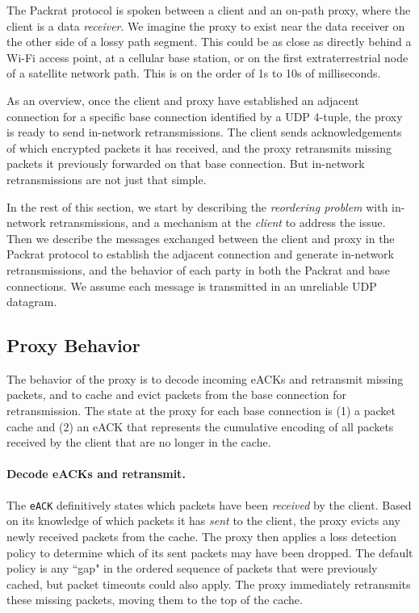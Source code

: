 The Packrat protocol is spoken between a client and an on-path proxy, where the
client is a data \textit{receiver}. We imagine the proxy to exist near the data
receiver on the other side of a lossy path segment. This could be as close as
directly behind a Wi-Fi access point, at a cellular base station, or on the
first extraterrestrial node of a satellite network path. This is on the order
of 1s to 10s of milliseconds.

As an overview, once the client and proxy have established an adjacent
connection for a specific base connection identified by a UDP 4-tuple, the
proxy is ready to send in-network retransmissions. The client sends
acknowledgements of which encrypted packets it has received, and the proxy retransmits missing
packets it previously forwarded on that base connection.
But in-network retransmissions are not just that simple.

In the rest of this section, we start by describing the \textit
{reordering problem} with in-network retransmissions, and a mechanism at
the \textit{client} to address the issue. Then we describe the messages
exchanged between the client and proxy in the Packrat protocol to establish the
adjacent connection and generate in-network retransmissions,
and the behavior of each party in both the Packrat and base
connections. We assume each message is transmitted in an unreliable UDP
datagram.

\subsection{Proxy Behavior}

The behavior of the proxy is to decode incoming eACKs and retransmit missing
packets, and to cache and evict packets from the base connection for
retransmission. The state at the proxy for each base connection is (1) a packet
cache and (2) an eACK that represents the cumulative encoding of all packets
received by the client that are no longer in the cache.

\paragraph{Decode eACKs and retransmit.}

The \texttt{eACK} definitively states which packets have been \textit{received}
by the client. Based on its knowledge of which packets it has \textit{sent} to
the client, the proxy evicts any newly received packets from the cache. The
proxy then applies a loss detection policy to determine which of its sent
packets may have been dropped. The default
policy is any ``gap" in the ordered sequence of packets that were previously
cached, but packet timeouts could also apply. The proxy immediately retransmits
these missing packets, moving them to the top of the cache.

